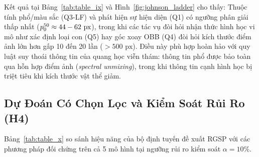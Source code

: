 Kết quả tại Bảng~\ref{tab:table_ix} và Hình~\ref{fig:johnson_ladder} cho thấy:
Thuộc tính phổ/màu sắc (Q3-LF) và phát hiện sự hiện diện (Q1) có ngưỡng phân giải thấp nhất ($p_0^{50} \approx 44 - 62\text{ px}$), trong khi các tác vụ đòi hỏi nhận thức hình học vi mô như xác định loại con (Q5) hay góc xoay OBB (Q4) đòi hỏi kích thước điểm ảnh lớn hơn gấp 10 đến 20 lần ($> 500\text{ px}$). Điều này phù hợp hoàn hảo với quy luật suy thoái thông tin của quang học viễn thám: thông tin phổ được bảo toàn qua hỗn hợp điểm ảnh (\textit{spectral unmixing}), trong khi thông tin cạnh hình học bị triệt tiêu khi kích thước vật thể giảm.

\subsection{Dự Đoán Có Chọn Lọc và Kiểm Soát Rủi Ro (H4)}
Bảng~\ref{tab:table_x} so sánh hiệu năng của bộ định tuyến đề xuất RGSP với các phương pháp đối chứng trên cả 5 mô hình tại ngưỡng rủi ro kiểm soát $\alpha = 10\%$.

